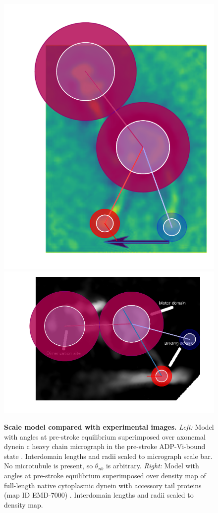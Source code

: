 \documentclass[9pt,twocolumn,twoside]{article}
\begin{document}
\begin{figure}[tbhp]
\includegraphics[width=0.4\linewidth]{../../plots/burgess-model-figure.pdf}%
\includegraphics[width=0.6\linewidth]{../../plots/grotjahn-model-figure.pdf}%
\caption{\textbf{Scale model compared with experimental images.} \textit{Left:} Model with angles at pre-stroke equilibrium superimposed over axonemal dynein c heavy chain micrograph in the pre-stroke ADP-Vi-bound state \cite{burgess-paper}. Interdomain lengths and radii scaled to micrograph scale bar. No microtubule is present, so $\theta_{nb}$ is arbitrary. \textit{Right: } Model with angles at pre-stroke equilibrium superimposed over density map of full-length native cytoplasmic dynein with accessory tail proteins (map ID EMD-7000) \cite{grotjahn}. Interdomain lengths and radii scaled to density map.}
\label{fig:micrographs}
\end{figure}


\end{document}
